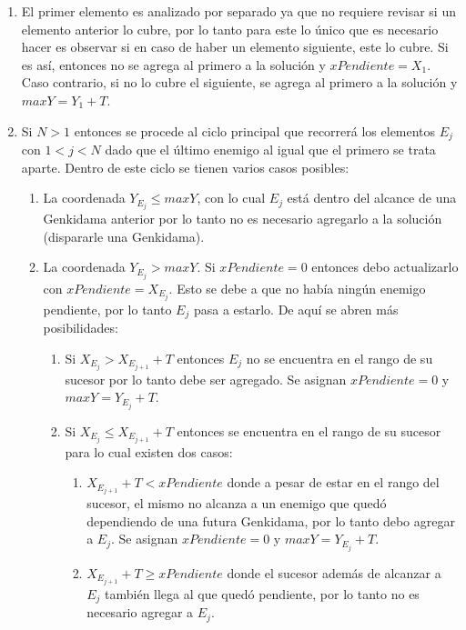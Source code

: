 	\begin{enumerate}
		\item{
			El primer elemento es analizado por separado ya que no requiere
			revisar si un elemento anterior lo cubre, por lo tanto para este lo
			único que es necesario hacer es observar si en caso de haber un elemento
			siguiente, este lo cubre. Si es así, entonces no se agrega al primero a
			la solución y $xPendiente = X_1$. Caso contrario, si no lo cubre el
			siguiente, se agrega al primero a la solución y $maxY = Y_1 + T$.
		}

		\item{
			Si $N > 1$ entonces se procede al ciclo principal que recorrerá los
			elementos $E_j$ con $1 < j < N$ dado que el último enemigo al igual
			que el primero se trata aparte. Dentro de este ciclo se tienen
			varios casos posibles:
			\begin{enumerate}
				\item{
					La coordenada $Y_{E_j} \leq maxY$, con lo cual $E_j$ está
					dentro del alcance de una Genkidama anterior por lo tanto no
					es necesario agregarlo a la solución (dispararle una
					Genkidama).
					}
				\item{
					La coordenada $Y_{E_j} > maxY$. Si $xPendiente = 0$ entonces
					debo actualizarlo con $xPendiente = X_{E_j}$. Esto se debe a
					que no había ningún enemigo pendiente, por lo tanto $E_j$
					pasa a estarlo. De aquí se abren más posibilidades:
					\begin{enumerate}
						\item{Si $X_{E_j} > X_{E_{j+1}} + T$ entonces $E_j$ no
							se encuentra en el rango de su sucesor por lo tanto
							debe ser agregado. Se asignan $xPendiente = 0$ y
							$maxY = Y_{E_j} + T$.}
						\item{Si $X_{E_j} \leq X_{E_{j+1}} + T$ entonces se
							encuentra en el rango de su sucesor para lo cual
							existen dos casos:}
						\begin{enumerate}
							\item{$X_{E_{j+1}} + T < xPendiente$ donde a pesar
								de estar en el rango del sucesor, el mismo no
								alcanza a un enemigo que quedó dependiendo de
								una futura Genkidama, por lo tanto debo agregar
								a $E_j$. Se asignan $xPendiente = 0$ y $maxY = Y_{E_j} + T$.}
							\item{$X_{E_{j+1}} + T \geq xPendiente$ donde el
								sucesor además de alcanzar a $E_j$ también llega
								al que quedó pendiente, por lo tanto no es
								necesario agregar a $E_j$.}

\end{enumerate}
\end{enumerate}}
\end{enumerate}}
\end{enumerate}
